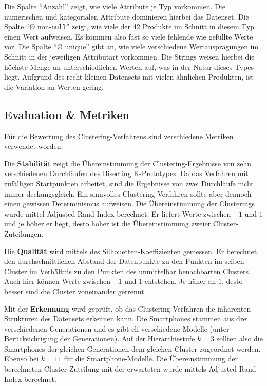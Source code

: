 Die Spalte ``Anzahl'' zeigt, wie viele Attribute je Typ vorkommen. Die
numerischen und kategorialen Attribute dominieren hierbei das Datenset.
Die Spalte ``Ø non-\texttt{null}'' zeigt, wie viele der 42 Produkte im
Schnitt in diesem Typ einen Wert aufweisen. Es kommen also fast so viele
fehlende wie gefüllte Werte vor. Die Spalte ``Ø unique'' gibt an, wie
viele verschiedene Wertausprägungen im Schnitt in der jeweiligen
Attributart vorkommen. Die Strings weisen hierbei die höchste Menge an
unterschiedlichen Werten auf, was in der Natur dieses Types liegt.
Aufgrund des recht kleinen Datensets mit vielen ähnlichen Produkten, ist
die Variation an Werten gering.

\hypertarget{evaluation-metriken}{%
\subsection{Evaluation \& Metriken}\label{evaluation-metriken}}

Für die Bewertung des Clustering-Verfahrens sind verschiedene Metriken
verwendet worden:

Die \textbf{Stabilität} zeigt die Übereinstimmung der
Clustering-Ergebnisse von zehn verschiedenen Durchläufen des Bisecting
K-Prototypes. Da das Verfahren mit zufälligen Startpunkten arbeitet,
sind die Ergebnisse von zwei Durchläufe nicht immer deckungsgleich. Ein
sinnvolles Clustering-Verfahren sollte aber dennoch einen gewissen
Determinismus aufweisen. Die Übereinstimmung der Clusterings wurde
mittel Adjusted-Rand-Index \autocite{hubert1985} berechnet. Er liefert
Werte zwischen \(-1\) und \(1\) und je höher er liegt, desto höher ist
die Übereinstimmung zweier Cluster-Zuteilungen.

Die \textbf{Qualität} wird mittels des Silhouetten-Koeffizienten
\autocite{rousseeuw1987} gemessen. Er berechnet den durchschnittlichen
Abstand der Datenpunkte zu den Punkten im selben Cluster im Verhältnis
zu den Punkten des unmittelbar benachbarten Clusters. Auch hier können
Werte zwischen \(-1\) und \(1\) entstehen. Je näher an \(1\), desto
besser sind die Cluster voneinander getrennt.

Mit der \textbf{Erkennung} wird geprüft, ob das Clustering-Verfahren die
inhärenten Strukturen des Datensets erkennen kann. Die Smartphones
stammen aus drei verschiedenen Generationen und es gibt elf verschiedene
Modelle (unter Berücksichtigung der Generationen). Auf der
Hierarchiestufe \(k=3\) sollten also die Smartphones der gleichen
Generationen dem gleichen Cluster zugeordnet werden. Ebenso bei \(k=11\)
für die Smartphone-Modelle. Die Übereinstimmung der berechneten
Cluster-Zuteilung mit der erwarteten wurde mittels Adjusted-Rand-Index
berechnet.

